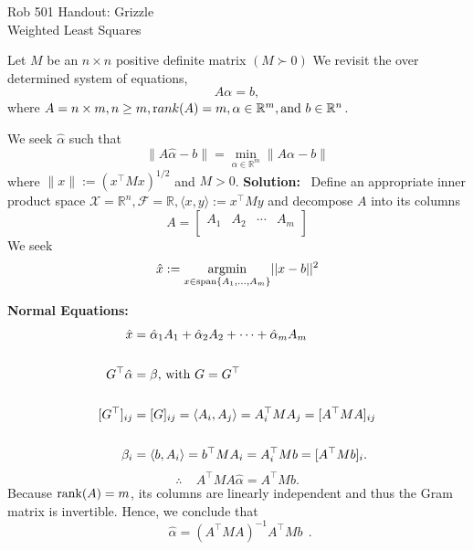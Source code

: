 \documentclass[letterpaper]{article}
\newcommand{\real}{\mathbb R}  %
\begin{document}
\baselineskip=48pt  %


\setlength{\parskip}{.3in}
\setlength{\itemsep}{.3in}

\pagestyle{plain}

{\Large \bf
\begin{center}
Rob 501 Handout: Grizzle \\
Weighted Least Squares
\end{center}
}


\Large

    Let $M$ be an $n \times n$ positive definite matrix $(M \succ0 )$
    We revisit the over determined system of equations,
     $$A \alpha = b,$$
      where $A = n \times m, n \ge m, {\mathrm rank}(A)=m, \alpha \in \real^m, \textnormal{and } b \in \real^n $. 
      
      We seek $\hat{\alpha}$ such that
    \begin{equation*}
        \| A\hat{\alpha}-b \| = \min_{\alpha \in \real^m} \| A\alpha-b \|
    \end{equation*}
    where $ \| x \|:=\left(x^\top Mx\right)^{1/2}$ and $M>0$.
    \newline\newline
\textbf{Solution:}~ Define an appropriate inner product space $ \mathcal{X}= \real^n, \mathcal{F}=\real, \langle x, y \rangle := x^\top My $ and decompose $A$ into its columns
    $$A= \left[ \begin{array}{c|c|c|c} A_1 & A_2 & \cdots & A_m\\ \end{array} \right] $$
    We seek 
    $$\hat{x} :=\underset{x \in {\rm span} \{A_1, \ldots, A_m\}}{\rm argmin} ||x-b||^2$$

\noindent \textbf{Normal Equations:}
    \begin{align*}
        \hat{x}&=\hat{\alpha}_1 A_1 + \hat{\alpha}_2 A_2 + \cdots + \hat{\alpha}_m A_m\\
        \\
        G^\top \hat{\alpha}&=\beta \textnormal{, with } G = G^\top\\
        \\
        [G^\top]_{ij}&=[G]_{ij}=\langle A_i, A_j \rangle=A_i^\top MA_j=[A^\top MA]_{ij}\\
        \\
        \beta_i&=\langle b, A_i \rangle=b^\top MA_i=A_i^\top Mb=[A^\top Mb]_i.\\
    \end{align*}
    $$ \boxed{\therefore ~~~~~A^\top MA \hat{\alpha}=A^\top Mb}.$$
    \newline\newline
  Because  $ {\rm rank}(A)=m $, its columns are linearly independent and thus the Gram matrix is invertible. Hence, we conclude that
    \begin{equation*}
        \boxed{~~\hat{\alpha}=(A^\top MA)^{-1}A^\top Mb~~}.
    \end{equation*}
    
    
\end{document}
